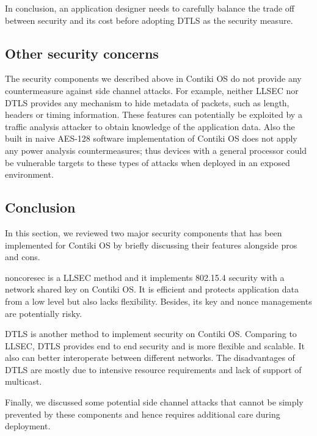 In conclusion, an application designer needs to carefully balance the trade off between security and its cost before adopting DTLS as the security measure.

\subsection{Other security concerns}
The security components we described above in Contiki OS do not provide any countermeasure against side channel attacks. For example, neither LLSEC nor DTLS provides any mechanism to hide  metadata of packets, such as length, headers or timing information. These features can potentially be exploited by a traffic analysis attacker\cite{ta1} \cite{ta2} \cite{ta3} to obtain knowledge of the application data.  Also the built in naive AES-128 software implementation of Contiki OS does not apply any power analysis\cite{DPA1} \cite{DPA2} countermeasures; thus devices with a general processor could be vulnerable targets to these types of attacks when deployed in an exposed environment.

\subsection{Conclusion}
In this section, we reviewed two major security components that has been implemented for Contiki OS by briefly discussing their features alongside pros and cons. 

noncoresec is a LLSEC method and it implements 802.15.4 security with a network shared key on Contiki OS. It is efficient and protects application data from a low level but also lacks flexibility. Besides, its key and nonce managements are potentially risky.

DTLS is another method to implement security on Contiki OS. Comparing to LLSEC, DTLS provides end to end security and is more flexible and scalable. It also can better interoperate between different networks. The disadvantages of DTLS are mostly due to intensive resource requirements and lack of support of multicast.

Finally, we discussed some potential side channel attacks that cannot be simply prevented by these components and hence requires additional care during deployment.

